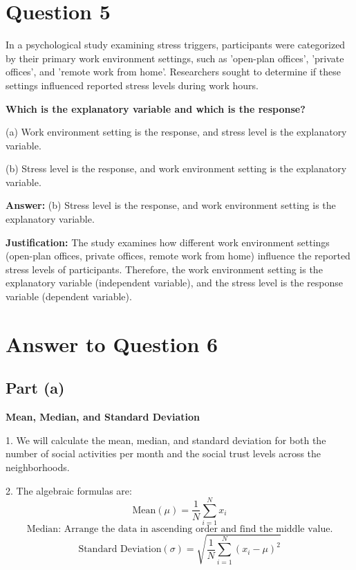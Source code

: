\documentclass{article}
\begin{document}
\section*{Question 5}
In a psychological study examining stress triggers, participants were categorized by their primary work environment settings, such as 'open-plan offices', 'private offices', and 'remote work from home'. Researchers sought to determine if these settings influenced reported stress levels during work hours.

\textbf{Which is the explanatory variable and which is the response?}

(a) Work environment setting is the response, and stress level is the explanatory variable.

(b) Stress level is the response, and work environment setting is the explanatory variable.

\textbf{Answer:} (b) Stress level is the response, and work environment setting is the explanatory variable.

\textbf{Justification:} The study examines how different work environment settings (open-plan offices, private offices, remote work from home) influence the reported stress levels of participants. Therefore, the work environment setting is the explanatory variable (independent variable), and the stress level is the response variable (dependent variable).

\section*{Answer to Question 6}

\subsection*{Part (a)}

\textbf{Mean, Median, and Standard Deviation}

1. We will calculate the mean, median, and standard deviation for both the number of social activities per month and the social trust levels across the neighborhoods.

2. The algebraic formulas are:
\[
\text{Mean} (\mu) = \frac{1}{N} \sum_{i=1}^{N} x_i
\]
\[
\text{Median: Arrange the data in ascending order and find the middle value.}
\]
\[
\text{Standard Deviation} (\sigma) = \sqrt{\frac{1}{N} \sum_{i=1}^{N} (x_i - \mu)^2}
\]
\end{document}
